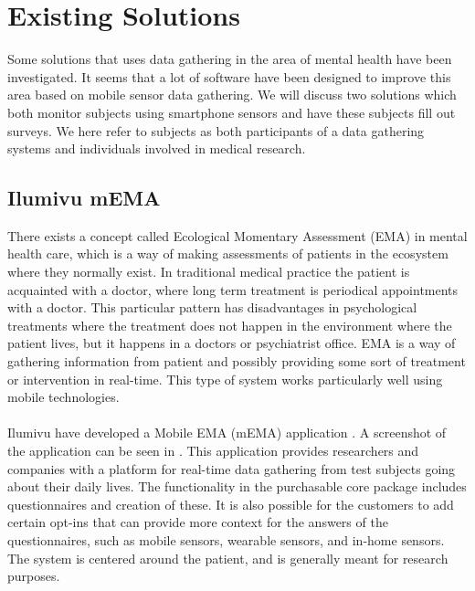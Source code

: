 
\section{Existing Solutions}
\label{sec:existing_solutions}

Some solutions that uses data gathering in the area of mental health have been investigated. It seems that a lot of software have been designed to improve this area based on mobile sensor data gathering. We will discuss two solutions which both monitor subjects using smartphone sensors and have these subjects fill out surveys. We here refer to subjects as both participants of a data gathering systems and individuals involved in medical research.

\subsection{Ilumivu mEMA}
\label{sub:ilumivu_mema}
There exists a concept called Ecological Momentary Assessment (EMA) \parencite{shiffman2008ecological} in mental health care, which is a way of making assessments of patients in the ecosystem where they normally exist. In traditional medical practice the patient is acquainted with a doctor, where long term treatment is periodical appointments with a doctor. This particular pattern has disadvantages in psychological treatments where the treatment does not happen in the environment where the patient lives, but it happens in a doctors or psychiatrist office. EMA is a way of gathering information from patient and possibly providing some sort of treatment or intervention in real-time. This type of system works particularly well using mobile technologies.
\\\\
Ilumivu have developed a Mobile EMA (mEMA) application \parencite{lumivu}. A screenshot of the application can be seen in . This application provides researchers and companies with a platform for real-time data gathering from test subjects going about their daily lives. The functionality in the purchasable core package includes questionnaires and creation of these. It is also possible for the customers to add certain opt-ins that can provide more context for the answers of the questionnaires, such as mobile sensors, wearable sensors, and in-home sensors. The system is centered around the patient, and is generally meant for research purposes.

